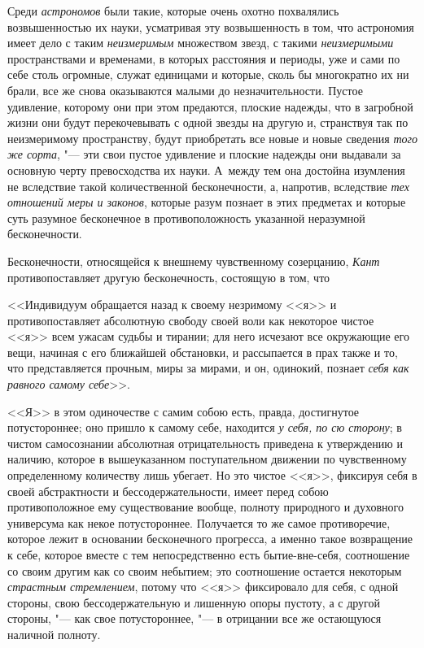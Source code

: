 Среди {\em астрономов} были такие, которые очень охотно
похвалялись возвышенностью их науки, усматривая эту возвышенность в том,
что астрономия имеет дело с таким {\em неизмеримым}
множеством звезд, с такими {\em неизмеримыми}
пространствами и временами, в которых расстояния и периоды, уже и сами по
себе столь огромные, служат единицами и которые, сколь бы многократно их ни
брали, все же снова оказываются малыми до незначительности. Пустое
удивление, которому они при этом предаются, плоские надежды, что в
загробной жизни они будут перекочевывать с одной звезды на другую и,
странствуя так по неизмеримому пространству, будут приобретать все новые и
новые сведения {\em того же сорта}, "--- эти свои пустое
удивление и плоские надежды они выдавали за основную черту превосходства их
науки. А~между тем она достойна изумления не вследствие такой
количественной бесконечности, а, напротив, вследствие
{\em тех отношений меры и законов}, которые разум
познает в этих предметах и которые суть разумное бесконечное в
противоположность указанной неразумной бесконечности.

Бесконечности, относящейся к внешнему чувственному созерцанию,
{\em Кант} противопоставляет другую бесконечность,
состоящую в том, что

<<Индивидуум обращается назад к своему незримому <<я>> и противопоставляет
абсолютную свободу своей воли как некоторое чистое <<я>> всем ужасам судьбы и
тирании; для него исчезают все окружающие его вещи, начиная с его ближайшей
обстановки, и рассыпается в прах также и то, что представляется прочным,
миры за мирами, и он, одинокий, познает {\em себя как
равного самому себе}>>.

<<Я>> в этом одиночестве с самим собою есть, правда, достигнутое
потустороннее; оно пришло к самому себе, находится
{\em у себя, по сю сторону}; в чистом самосознании
абсолютная отрицательность приведена к утверждению и наличию, которое в
вышеуказанном поступательном движении по чувственному определенному
количеству лишь убегает. Но это чистое <<я>>, фиксируя себя в своей
абстрактности и бессодержательности, имеет перед собою противоположное ему
существование вообще, полноту природного и духовного универсума как некое
потустороннее. Получается то же самое противоречие, которое лежит в
основании бесконечного прогресса, а именно такое возвращение к себе,
которое вместе с тем непосредственно есть бытие-вне-себя, соотношение со
своим другим как со своим небытием; это соотношение остается некоторым
{\em страстным стремлением}, потому что <<я>> фиксировало
для себя, с одной стороны, свою бессодержательную и лишенную опоры пустоту,
а с другой стороны, "--- как свое потустороннее, "--- в отрицании все же
остающуюся наличной полноту.


